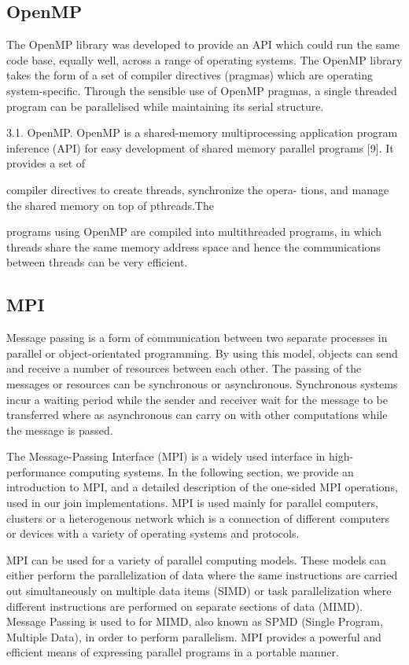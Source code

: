 \documentclass[10pt,twocolumn]{witseiepaper}
\begin{document}
\subsection{OpenMP}

The OpenMP library was developed to provide an API which could run the same code base, equally well,
across a range of operating systems. The OpenMP library takes the form of a set of compiler directives (pragmas) which are operating system-specific. Through the sensible use of OpenMP pragmas, a single threaded program can be parallelised while maintaining its serial structure.

3.1. OpenMP. OpenMP is a shared-memory multiprocessing
application program inference (API) for easy development
of shared memory parallel programs [9]. It provides a set of

compiler directives to create threads, synchronize the opera-
tions, and manage the shared memory on top of pthreads.The

programs using OpenMP are compiled into multithreaded
programs, in which threads share the same memory address
space and hence the communications between threads can be
very efficient.

\subsection{MPI}

Message passing is a form of communication between two separate processes in parallel or object-orientated programming. By using this model, objects can send and receive a number of resources between each other. The passing of the messages or resources can be synchronous or asynchronous. Synchronous systems incur a waiting period while the sender and receiver wait for the message to be transferred where as asynchronous can carry on with other computations while the message is passed.  

The Message-Passing Interface (MPI) is a widely used interface in high-performance computing systems. In the following section, we provide an introduction to MPI, and a detailed description of the one-sided MPI operations, used in our join implementations. MPI is used mainly for parallel computers, clusters or a heterogenous network which is a connection of different computers or devices with a variety of operating systems and protocols.

MPI can be used for a variety of parallel computing models. These models can either perform the parallelization of data where the same instructions are carried out simultaneously on multiple data items (SIMD) or task parallelization where different instructions are performed on separate sections of data (MIMD). Message Passing is used to for MIMD, also known as SPMD (Single Program, Multiple Data), in order to perform parallelism. MPI provides a powerful and efficient means of expressing parallel programs in a portable manner.
\end{document}
